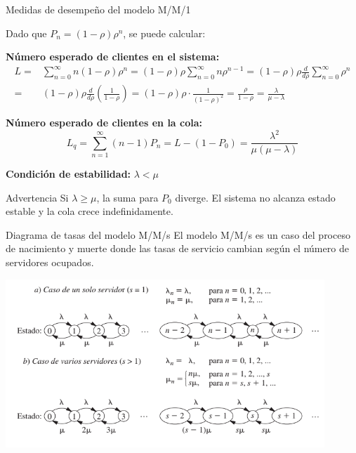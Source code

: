 \documentclass{beamer}
\begin{document}
\begin{frame}{Medidas de desempeño del modelo M/M/1}
\justifying

Dado que $P_n = (1 - \rho)\rho^n$, se puede calcular:

\medskip
\textbf{Número esperado de clientes en el sistema:}
\begin{align}
L =& \sum_{n=0}^{\infty} n(1 - \rho)\rho^n = (1-\rho)\rho \sum_{n=0}^{\infty} n\rho^{n-1} = (1-\rho)\rho\frac{d}{d\rho}\sum_{n=0}^\infty\rho^n\\
=&(1-\rho)\rho\frac{d}{d\rho}\left( \frac{1}{1-\rho}\right) =(1-\rho)\rho\cdot \frac{1}{(1-\rho)^2}= \frac{\rho}{1-\rho}=\frac{\lambda}{\mu - \lambda} 
\end{align}

\textbf{Número esperado de clientes en la cola:}
\[
L_q = \sum_{n=1}^{\infty} (n - 1)P_n = L - (1 - P_0) = \frac{\lambda^2}{\mu(\mu - \lambda)}
\]

\medskip
\textbf{Condición de estabilidad:} \( \lambda < \mu \)

\begin{block}{Advertencia}
Si $\lambda \geq \mu$, la suma para $P_0$ diverge. El sistema no alcanza estado estable y la cola crece indefinidamente.
\end{block}
\end{frame}

\begin{frame}{Diagrama de tasas del modelo M/M/s}
\justifying
El modelo M/M/s es un caso del proceso de nacimiento y muerte donde las tasas de servicio cambian según el número de servidores ocupados.

\begin{center}
    \includegraphics[width=0.9\textwidth]{images/Modelo_mms.png}
\end{center}
\end{frame}
\end{document}
